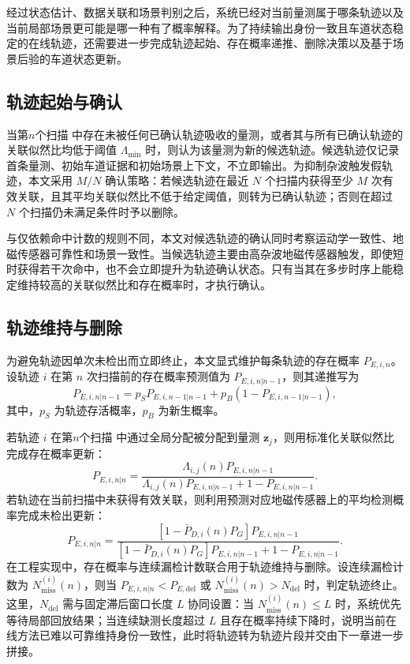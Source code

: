 \documentclass{xdupgthesis}
\begin{document}
经过状态估计、数据关联和场景判别之后，系统已经对当前量测属于哪条轨迹以及当前局部场景更可能是哪一种有了概率解释。为了持续输出身份一致且车道状态稳定的在线轨迹，还需要进一步完成轨迹起始、存在概率递推、删除决策以及基于场景后验的车道状态更新。


\subsection{轨迹起始与确认}

当第$n$个扫描 中存在未被任何已确认轨迹吸收的量测，或者其与所有已确认轨迹的关联似然比均低于阈值 $\Lambda_{\min}$ 时，则认为该量测为新的候选轨迹。候选轨迹仅记录首条量测、初始车道证据和初始场景上下文，不立即输出。为抑制杂波触发假轨迹，本文采用 $M/N$ 确认策略：若候选轨迹在最近 $N$ 个扫描内获得至少 $M$ 次有效关联，且其平均关联似然比不低于给定阈值，则转为已确认轨迹；否则在超过 $N$ 个扫描仍未满足条件时予以删除。

与仅依赖命中计数的规则不同，本文对候选轨迹的确认同时考察运动学一致性、地磁传感器可靠性和场景一致性。当候选轨迹主要由高杂波地磁传感器触发，即使短时获得若干次命中，也不会立即提升为轨迹确认状态。只有当其在多步时序上能稳定维持较高的关联似然比和存在概率时，才执行确认。

\subsection{轨迹维持与删除}

为避免轨迹因单次未检出而立即终止，本文显式维护每条轨迹的存在概率 $P_{E,i,n}$。设轨迹 $i$ 在第 $n$ 次扫描前的存在概率预测值为 $P_{E,i,n|n-1}$，则其递推写为
\begin{equation}
	P_{E,i,n|n-1}=p_S P_{E,i,n-1|n-1}+p_B\left(1-P_{E,i,n-1|n-1}\right),
	\label{eq:ch3_exist_predict_v2}
\end{equation}
其中，$p_S$ 为轨迹存活概率，$p_B$ 为新生概率。

若轨迹 $i$ 在第$n$个扫描 中通过全局分配被分配到量测 $\mathbf z_j$，则用标准化关联似然比完成存在概率更新：
\begin{equation}
	P_{E,i,n|n}=
	\frac{\Lambda_{i,j}(n)P_{E,i,n|n-1}}{\Lambda_{i,j}(n)P_{E,i,n|n-1}+1-P_{E,i,n|n-1}}.
	\label{eq:ch3_exist_hit_v2}
\end{equation}
若轨迹在当前扫描中未获得有效关联，则利用预测对应地磁传感器上的平均检测概率完成未检出更新：
\begin{equation}
	P_{E,i,n|n}=
	\frac{\left[1-\bar P_{D,i}(n)P_G\right]P_{E,i,n|n-1}}{\left[1-\bar P_{D,i}(n)P_G\right]P_{E,i,n|n-1}+1-P_{E,i,n|n-1}}.
	\label{eq:ch3_exist_miss_v2}
\end{equation}
在工程实现中，存在概率与连续漏检计数联合用于轨迹维持与删除。设连续漏检计数为 $N_{\mathrm{miss}}^{(i)}(n)$，则当 $P_{E,i,n|n} < P_{E,\mathrm{del}}$ 或 $N_{\mathrm{miss}}^{(i)}(n) > N_{\mathrm{del}}$ 时，判定轨迹终止。这里，$N_{\mathrm{del}}$ 需与固定滞后窗口长度 $L$ 协同设置：当 $N_{\mathrm{miss}}^{(i)}(n)\le L$ 时，系统优先等待局部回放结果；当连续缺测长度超过 $L$ 且存在概率持续下降时，说明当前在线方法已难以可靠维持身份一致性，此时将轨迹转为轨迹片段并交由下一章进一步拼接。
\end{document}
